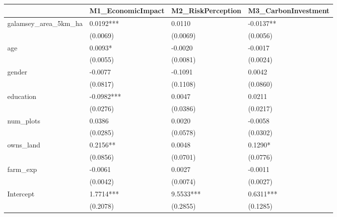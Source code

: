 \begin{table}
\caption{}
\label{}
\begin{center}
\begin{tabular}{llll}
\hline
                               & M1\_EconomicImpact & M2\_RiskPerception & M3\_CarbonInvestment  \\
\hline
galamsey\_area\_5km\_ha        & 0.0192***          & 0.0110             & -0.0137**             \\
                               & (0.0069)           & (0.0069)           & (0.0056)              \\
age                            & 0.0093*            & -0.0020            & -0.0017               \\
                               & (0.0055)           & (0.0081)           & (0.0024)              \\
gender                         & -0.0077            & -0.1091            & 0.0042                \\
                               & (0.0817)           & (0.1108)           & (0.0860)              \\
education                      & -0.0982***         & 0.0047             & 0.0211                \\
                               & (0.0276)           & (0.0386)           & (0.0217)              \\
num\_plots                     & 0.0386             & 0.0020             & -0.0058               \\
                               & (0.0285)           & (0.0578)           & (0.0302)              \\
owns\_land                     & 0.2156**           & 0.0048             & 0.1290*               \\
                               & (0.0856)           & (0.0701)           & (0.0776)              \\
farm\_exp                      & -0.0061            & 0.0027             & -0.0011               \\
                               & (0.0042)           & (0.0074)           & (0.0027)              \\
Intercept                      & 1.7714***          & 9.5533***          & 0.6311***             \\
                               & (0.2078)           & (0.2855)           & (0.1285)              \\

\end{tabular}
\end{center}
\end{table}
